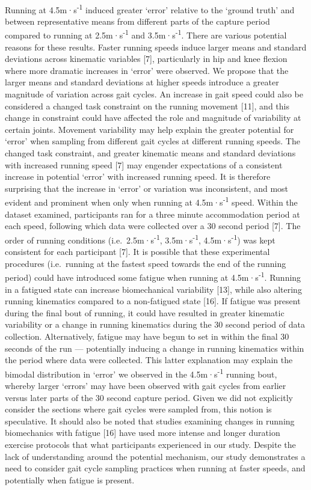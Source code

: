 \documentclass[]{elsarticle} %
\begin{document}
~

Running at 4.5m·s\textsuperscript{-1} induced greater `error' relative
to the `ground truth' and between representative means from different
parts of the capture period compared to running at
2.5m·s\textsuperscript{-1} and 3.5m·s\textsuperscript{-1}. There are
various potential reasons for these results. Faster running speeds
induce larger means and standard deviations across kinematic variables
{[}7{]}, particularly in hip and knee flexion where more dramatic
increases in `error' were observed. We propose that the larger means and
standard deviations at higher speeds introduce a greater magnitude of
variation across gait cycles. An increase in gait speed could also be
considered a changed task constraint on the running movement {[}11{]},
and this change in constraint could have affected the role and magnitude
of variability at certain joints. Movement variability may help explain
the greater potential for `error' when sampling from different gait
cycles at different running speeds. The changed task constraint, and
greater kinematic means and standard deviations with increased running
speed {[}7{]} may engender expectations of a consistent increase in
potential `error' with increased running speed. It is therefore
surprising that the increase in `error' or variation was inconsistent,
and most evident and prominent when only when running at
4.5m·s\textsuperscript{-1} speed. Within the dataset examined,
participants ran for a three minute accommodation period at each speed,
following which data were collected over a 30 second period {[}7{]}. The
order of running conditions (i.e.~2.5m·s\textsuperscript{-1},
3.5m·s\textsuperscript{-1}, 4.5m·s\textsuperscript{-1}) was kept
consistent for each participant {[}7{]}. It is possible that these
experimental procedures (i.e.~running at the fastest speed towards the
end of the running period) could have introduced some fatigue when
running at 4.5m·s\textsuperscript{-1}. Running in a fatigued state can
increase biomechanical variability {[}13{]}, while also altering running
kinematics compared to a non-fatigued state {[}16{]}. If fatigue was
present during the final bout of running, it could have resulted in
greater kinematic variability or a change in running kinematics during
the 30 second period of data collection. Alternatively, fatigue may have
begun to set in within the final 30 seconds of the run --- potentially
inducing a change in running kinematics within the period where data
were collected. This latter explanation may explain the bimodal
distribution in `error' we observed in the 4.5m·s\textsuperscript{-1}
running bout, whereby larger `errors' may have been observed with gait
cycles from earlier versus later parts of the 30 second capture period.
Given we did not explicitly consider the sections where gait cycles were
sampled from, this notion is speculative. It should also be noted that
studies examining changes in running biomechanics with fatigue {[}16{]}
have used more intense and longer duration exercise protocols that what
participants experienced in our study. Despite the lack of understanding
around the potential mechanism, our study demonstrates a need to
consider gait cycle sampling practices when running at faster speeds,
and potentially when fatigue is present.
\end{document}
